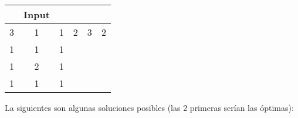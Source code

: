 \documentclass[11pt, a4paper, twoside]{article}
\begin{document}
\begin{ejemplo}\hspace{0em} \\
    \begin{center}
	\begin{minipage}{0.4\textwidth}
			\begin{tabular}{cccccc}
			 & Input \\
			   \hline
			   3 & 1 & 1 & 2 & 3 & 2\\
			   1 & 1 & 1 &   &   &  \\
			   1 & 2 & 1 &   &   &  \\
			   1 & 1 & 1 &   &   &  \\
			\end{tabular}
	\end{minipage}
	\end{center}
	
La siguientes son algunas soluciones posibles (las 2 primeras serían las óptimas): \\	


\end{ejemplo}
\end{document}
